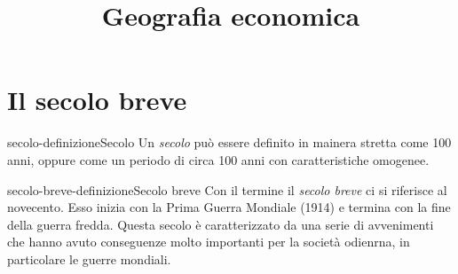 \documentclass[preview]{standalone}
\begin{document}
\title{Geografia economica}
\genpage

\section{Il secolo breve}

\begin{snippetdefinition}{secolo-definizione}{Secolo}
    Un \textit{secolo} può essere definito in mainera stretta come 100 anni,
    oppure come un periodo di circa 100 anni con caratteristiche omogenee.
\end{snippetdefinition}

\begin{snippetdefinition}{secolo-breve-definizione}{Secolo breve}
    Con il termine il \textit{secolo breve} ci si riferisce al novecento.
    Esso inizia con la Prima Guerra Mondiale (1914) e termina con la fine della guerra fredda.
    Questa secolo è caratterizzato da una serie di avvenimenti che hanno avuto conseguenze molto importanti
    per la società odienrna, in particolare le guerre mondiali.
\end{snippetdefinition}
\end{document}
